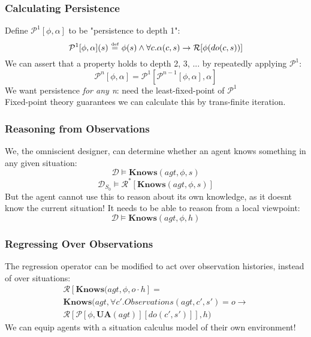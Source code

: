 \documentclass{beamer}
\newcommand{\isdef}{\hbox{$\stackrel{\mbox{\tiny def}}{=}$}}
\begin{document}
\begin{frame}
\frametitle{Calculating Persistence}
Define $\mathcal{P}^{1}[\phi,\alpha]$ to be "persistence to depth 1":
\begin{equation*}
  \mathcal{P}^{1}[\phi,\alpha](s)\ \isdef\ \phi(s) \wedge \forall c . \alpha(c,s) \rightarrow \mathcal{R}[\phi(do(c,s))]
\end{equation*}
We can assert that a property holds to depth 2, 3, ... by repeatedly applying
$\mathcal{P}^{1}$:
\begin{equation*}
  \mathcal{P}^{n}[\phi,\alpha] = \mathcal{P}^{1}[\mathcal{P}^{n-1}[\phi,\alpha],\alpha]
\end{equation*}
We want persistence \emph{for any n}:  need the least-fixed-point of $\mathcal{P}^{1}$ \\
Fixed-point theory guarantees we can calculate this by trans-finite iteration.
\end{frame}

\begin{frame}
\frametitle{Reasoning from Observations}
We, the omniscient designer, can determine whether an agent knows something
 in any given situation:
\begin{equation*}
  \mathcal{D} \models \mathbf{Knows}(agt,\phi,s)
\end{equation*}
\begin{equation*}
  \mathcal{D}_{S_0} \models \mathcal{R}^{*}[\mathbf{Knows}(agt,\phi,s)]
\end{equation*}
But the agent cannot use this to reason about its own knowledge, as it doesnt
know the current situation!  It needs to be able to reason from a local
viewpoint:
\begin{equation*}
  \mathcal{D} \models \mathbf{Knows}(agt,\phi,h)
\end{equation*}
\end{frame}

\begin{frame}
\frametitle{Regressing Over Observations}
The regression operator can be modified to act over observation histories,
instead of over situations:
\begin{multline*}
  \mathcal{R}[\mathbf{Knows}(agt,\phi,o \cdot h] = \\
  \mathbf{Knows}(agt,\forall c' . Observations(agt,c',s')=o \rightarrow \\
     \mathcal{R}[\mathcal{P}[\phi,\mathbf{UA}(agt)][do(c',s')]],h)
\end{multline*}
We can equip agents with a situation calculus model of their own environment!
\end{frame}
\end{document}
